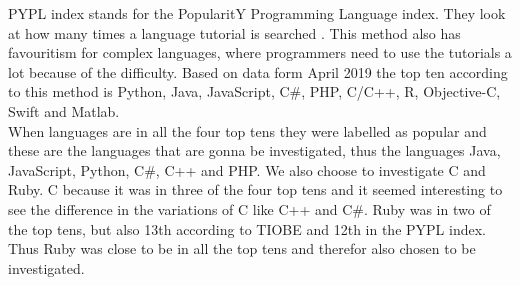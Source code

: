 PYPL index stands for the PopularitY Programming Language index. They look at how many times a language tutorial is searched \cite{car:2019}. This method also has favouritism for complex languages, where programmers need to use the tutorials a lot because of the difficulty. Based on data form April 2019 the top ten according to this method is Python, Java, JavaScript, C\#, PHP, C/C++, R, Objective-C, Swift and Matlab.\\

When languages are in all the four top tens they were labelled as popular and these are the languages that are gonna be investigated, thus the languages Java, JavaScript, Python, C\#, C++ and PHP. We also choose to investigate C and Ruby. C because it was in three of the four top tens and it seemed interesting to see the difference in the variations of C like C++ and C\#. Ruby was in two of the top tens, but also 13th according to TIOBE and 12th in the PYPL index. Thus Ruby was close to be in all the top tens and therefor also chosen to be investigated.


%

        
        

